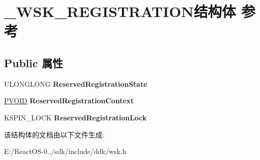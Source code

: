 \hypertarget{struct___w_s_k___r_e_g_i_s_t_r_a_t_i_o_n}{}\section{\+\_\+\+W\+S\+K\+\_\+\+R\+E\+G\+I\+S\+T\+R\+A\+T\+I\+O\+N结构体 参考}
\label{struct___w_s_k___r_e_g_i_s_t_r_a_t_i_o_n}
\subsection*{Public 属性}
\begin{DoxyCompactItemize}
\item 
\mbox{\label{struct___w_s_k___r_e_g_i_s_t_r_a_t_i_o_n_ae37869320313eded1274373ae8b9305b}} 
U\+L\+O\+N\+G\+L\+O\+NG {\bfseries Reserved\+Registration\+State}
\item 
\mbox{\label{struct___w_s_k___r_e_g_i_s_t_r_a_t_i_o_n_adea35ed7ddde05142c43e3de51fa8d36}} 
\hyperlink{interfacevoid}{P\+V\+O\+ID} {\bfseries Reserved\+Registration\+Context}
\item 
\mbox{\label{struct___w_s_k___r_e_g_i_s_t_r_a_t_i_o_n_ad1d8098cd0dfb6164a1f76a3c09746c4}} 
K\+S\+P\+I\+N\+\_\+\+L\+O\+CK {\bfseries Reserved\+Registration\+Lock}
\end{DoxyCompactItemize}


该结构体的文档由以下文件生成\+:\begin{DoxyCompactItemize}
\item 
E\+:/\+React\+O\+S-\/0../sdk/include/ddk/wsk.\+h\end{DoxyCompactItemize}
